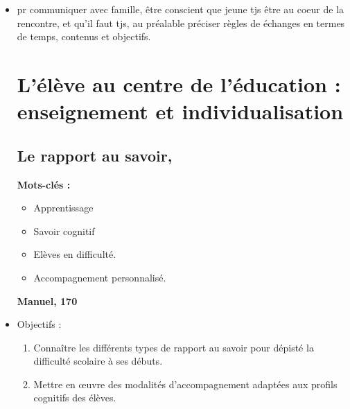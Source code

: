 \documentclass[12pt]{report}
\begin{document}
\begin{itemize}
\item pr communiquer avec famille, être conscient que jeune tjs être au coeur de la rencontre, et qu'il faut tjs, au préalable préciser règles de échanges en termes de temps, contenus et objectifs.




\chapter{L'élève au centre de l'éducation : enseignement et individualisation}

\section{Le rapport au savoir, }

\textbf{Mots-clés : } \\

\begin{itemize}
\item Apprentissage
\item Savoir cognitif
\item Elèves en difficulté.
\item Accompagnement personnalisé. \\
\end{itemize}

\textbf{Manuel, 170}

\item Objectifs : 
\begin{enumerate}
\item Connaître les différents types de rapport au savoir pour dépisté la difficulté scolaire à ses débuts. \\
\item Mettre en œuvre des modalités d'accompagnement adaptées aux profils cognitifs des élèves. \\
\end{enumerate}


\end{itemize}
\end{document}
